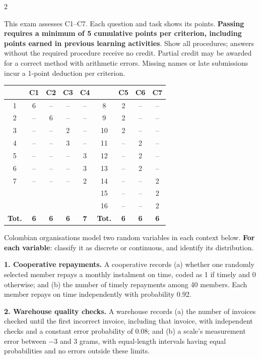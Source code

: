 \begin{multicols}{2}

This exam assesses C1--C7. Each question and task shows its points. \textbf{Passing requires a minimum of 5 cumulative points per criterion, including points earned in previous learning activities}. Show all procedures; answers without the required procedure receive no credit. Partial credit may be awarded for a correct method with arithmetic errors. Missing names or late submissions incur a 1-point deduction per criterion.

\begin{center}
	\small\setlength{\tabcolsep}{5pt}
	\begin{tabular}{|c|c|c|c|c||c|c|c|c|}
		\hline
		\textbf{\textnumero}&\textbf{C1}&\textbf{C2}&\textbf{C3}&\textbf{C4}&
		\textbf{\textnumero}&\textbf{C5}&\textbf{C6}&\textbf{C7}\\\hline
		1&6&--&--&--&8&2&--&--\\\hline
		2&--&6&--&--&9&2&--&--\\\hline
		3&--&--&2&--&10&2&--&--\\\hline
		4&--&--&3&--&11&--&2&--\\\hline
		5&--&--&--&3&12&--&2&--\\\hline
		6&--&--&--&3&13&--&2&--\\\hline
		7&--&--&--&2&14&--&--&2\\\hline
		&&&&&15&--&--&2\\\hline
		&&&&&16&--&--&2\\\hline
		\textbf{Tot.}&\textbf{6}&\textbf{6}&\textbf{6}&\textbf{7}&
		\textbf{Tot.}&\textbf{6}&\textbf{6}&\textbf{6}\\\hline
	\end{tabular}
\end{center}


\raggedcolumns
{}


Colombian organisations model two random variables in each context below. \textbf{For each variable}: classify it as discrete or continuous, and identify its distribution.

\textbf{1. Cooperative repayments.} A cooperative records (a) whether one randomly selected member repays a monthly instalment on time, coded as 1 if timely and 0 otherwise; and (b) the number of timely repayments among 40 members. Each member repays on time independently with probability 0.92. 

\textbf{2. Warehouse quality checks.} A warehouse records (a) the number of invoices checked until the first incorrect invoice, including that invoice, with independent checks and a constant error probability of 0.08; and (b) a scale's measurement error between $-3$ and $3$ grams, with equal-length intervals having equal probabilities and no errors outside these limits. 


\end{multicols}
